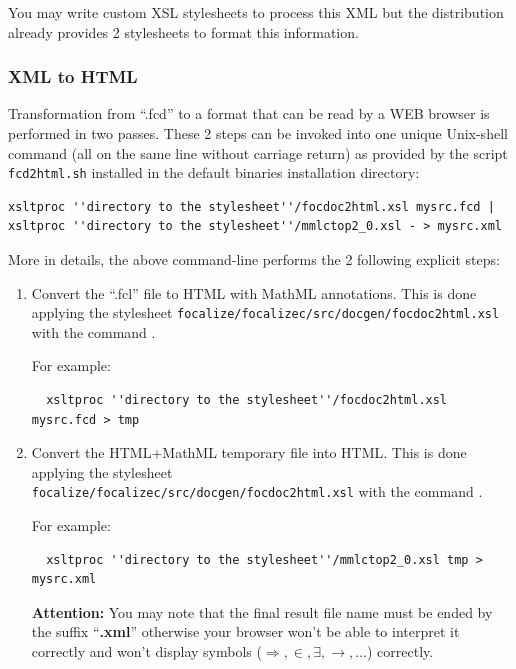 You may write custom XSL stylesheets to process this XML but the
distribution already provides 2 stylesheets to format this
information.



\subsubsection{XML to HTML}
Transformation from ``.fcd'' to a format that can be read by a WEB
browser is performed in two passes. These 2 steps can be invoked into
one unique Unix-shell command (all on the same line without carriage return)
as provided by the script {\tt fcd2html.sh} installed in the default binaries
installation directory:

{\scriptsize
\begin{verbatim}
xsltproc ''directory to the stylesheet''/focdoc2html.xsl mysrc.fcd |
xsltproc ''directory to the stylesheet''/mmlctop2_0.xsl - > mysrc.xml
\end{verbatim}}

\noindent More in details, the above command-line performs the 2 following
explicit steps:
\begin{enumerate}
  \item Convert the ``.fcl'' file to HTML with MathML annotations.
  This is done applying the stylesheet
  {\tt focalize/focalizec/src/docgen/focdoc2html.xsl} with the command
  \xsltproc.

  For example:
  {\scriptsize
  \begin{verbatim}
  xsltproc ''directory to the stylesheet''/focdoc2html.xsl mysrc.fcd > tmp
  \end{verbatim}
  }

  \item Convert the HTML+MathML temporary file into HTML.
  This is done applying the stylesheet\\
  {\tt focalize/focalizec/src/docgen/focdoc2html.xsl} with the command
  \xsltproc.

  For example:
  {\scriptsize
  \begin{verbatim}
  xsltproc ''directory to the stylesheet''/mmlctop2_0.xsl tmp > mysrc.xml
\end{verbatim}}

\smallskip
{\bf Attention:}
You may note that the final result file name must be ended by the
suffix ``{\bf .xml}'' otherwise your browser won't be able to interpret it
correctly and won't display symbols ($\Rightarrow, \in, \exists,
\rightarrow, \ldots$) correctly.
\end{enumerate}

